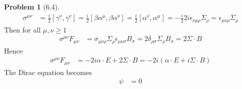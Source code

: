 \documentclass[twoside,11pt]{article}
\theoremstyle{definition}
\newtheorem{problem}{Problem}
\theoremstyle{remark}
\begin{document}
\begin{problem}[6.4]
\begin{align*}
    \sigma^{\mu\nu} &=
    \frac{i}{2}[\gamma^\nu, \gamma^\nu]
    = \frac{i}{2}[\beta\alpha^\mu,\beta\alpha^\nu]
    = \frac{i}{2}[\alpha^\nu, \alpha^\mu]
    = -\frac{i}{2}2i\epsilon_{\nu\mu\rho}\Sigma_\rho
    = \epsilon_{\mu\nu\rho}\Sigma_\rho
\end{align*}
Then for all $\mu,\nu\geq 1$
\begin{align*}
    \sigma^{\mu\nu}F_{\mu\nu} &= 
    \sigma_{\mu\nu\rho}\Sigma_\rho \epsilon_{\mu\nu\sigma}B_\sigma
    = 2\delta_{\rho\sigma}\Sigma_\rho B_\sigma
    = 2\Sigma\cdot B
\end{align*}
Hence 
\begin{align*}
    \sigma^{\mu\nu}F_{\mu\nu} &= 
    -2i\alpha\cdot E + 2\Sigma\cdot B
    = -2i (\alpha\cdot E + i\Sigma\cdot B)
\end{align*}
The Dirac equation becomes
\begin{align*}
    [(\partial - \frac{e}{c}A)^2
    +\frac{i\hbar e}{c}(\alpha\cdot E + i\Sigma\cdot B)
    - m^2c^2]
    \psi &= 0
\end{align*}

\end{problem}


\end{document}
